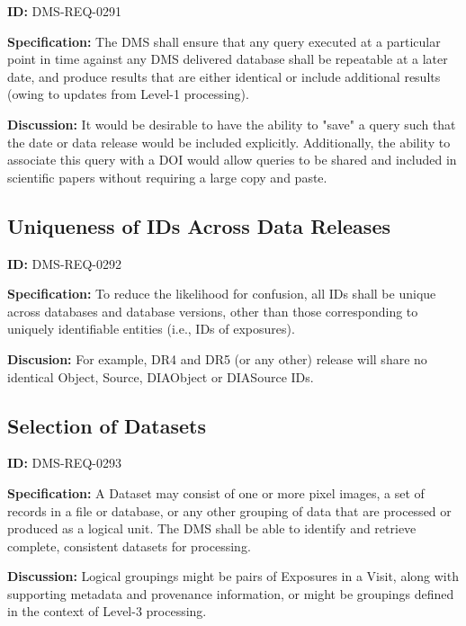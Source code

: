 \documentclass[SE,toc,lsstdraft]{lsstdoc}
\begin{document}
\label{DMS-REQ-0291}
\textbf{ID:} DMS-REQ-0291

\textbf{Specification:} The DMS shall ensure that any query executed at a particular point in time against any DMS delivered database shall be repeatable at a later date, and produce results that are either identical or include additional results (owing to updates from Level-1 processing).

\textbf{Discussion:} It would be desirable to have the ability to "save" a query such that the date or data release would be included explicitly. Additionally, the ability to associate this query with a DOI would allow queries to be shared and included in scientific papers without requiring a large copy and paste.




\subsection{Uniqueness of IDs Across Data Releases}

\label{DMS-REQ-0292}
\textbf{ID:} DMS-REQ-0292

\textbf{Specification:} To reduce the likelihood for confusion, all IDs shall be unique across databases and database versions, other than those corresponding to uniquely identifiable entities (i.e., IDs of exposures).

\textbf{Discusion:} For example, DR4 and DR5 (or any other) release will share no identical Object, Source, DIAObject or DIASource IDs.







\subsection{Selection of Datasets}

\label{DMS-REQ-0293}
\textbf{ID:} DMS-REQ-0293

\textbf{Specification:} A Dataset may consist of one or more pixel images, a set of records in a file or database, or any other grouping of data that are processed or produced as a logical unit. The DMS shall be able to identify and retrieve complete, consistent datasets for processing.

\textbf{Discussion: }Logical groupings might be pairs of Exposures in a Visit, along with supporting metadata and provenance information, or might be groupings defined in the context of Level-3 processing.
\end{document}
